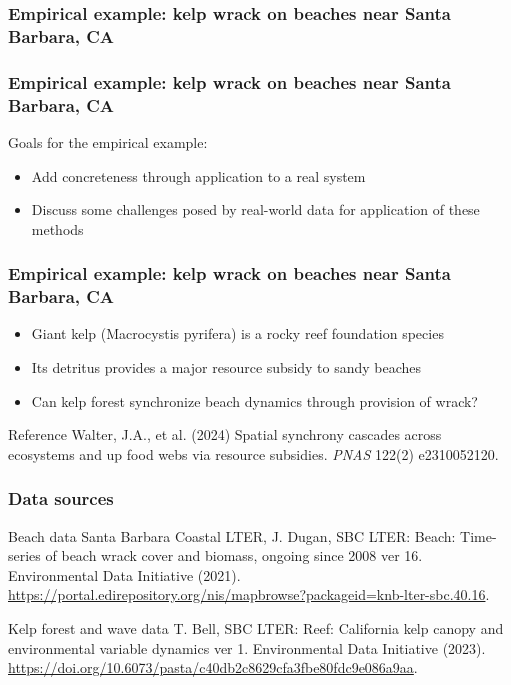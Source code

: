\documentclass{beamer}
\begin{document}
\begin{frame}
\frametitle{Empirical example: kelp wrack on beaches near Santa Barbara, CA}
\end{frame}

\begin{frame}
\frametitle{Empirical example: kelp wrack on beaches near Santa Barbara, CA}
Goals for the empirical example:
\begin{itemize}
\item Add concreteness through application to a real system
\item Discuss some challenges posed by real-world data for application of these methods
\end{itemize}
\end{frame}

\begin{frame}
\frametitle{Empirical example: kelp wrack on beaches near Santa Barbara, CA}
\begin{itemize}
\item Giant kelp (Macrocystis pyrifera) is a rocky reef foundation species
\item Its detritus provides a major resource subsidy to sandy beaches
\item Can kelp forest synchronize beach dynamics through provision of wrack?
\end{itemize}
\begin{block}{Reference}
Walter, J.A., et al. (2024) Spatial synchrony cascades across ecosystems and up food webs via resource subsidies. \textit{PNAS} 122(2) e2310052120.
\end{block}
\end{frame}

\begin{frame}
\frametitle{Data sources}
\begin{block}{Beach data}
Santa Barbara Coastal LTER, J. Dugan, SBC LTER: Beach: Time-series of beach wrack cover and biomass, ongoing since 2008 ver 16. Environmental Data Initiative (2021). \url{https://portal.edirepository.org/nis/mapbrowse?packageid=knb-lter-sbc.40.16}.
\end{block}
\begin{block}{Kelp forest and wave data}
T. Bell, SBC LTER: Reef: California kelp canopy and environmental variable dynamics ver 1.
Environmental Data Initiative (2023). \url{https://doi.org/10.6073/pasta/c40db2c8629cfa3fbe80fdc9e086a9aa}.
\end{block}
\end{frame}
\end{document}
